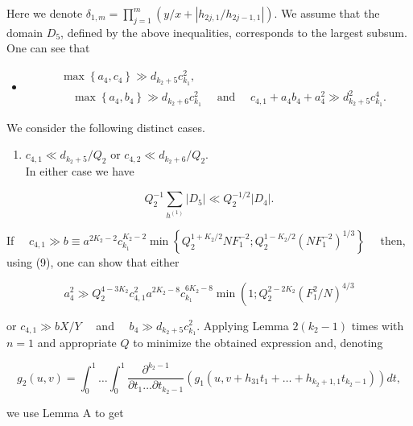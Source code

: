 \documentclass[10pt]{article}
\begin{document}
Here we denote $\delta_{1, m}=\prod_{j=1}^{m}\left(y / x+\left|h_{2 j, 1} / h_{2 j-1,1}\right|\right)$. We assume that the domain $D_{5}$, defined by the above inequalities, corresponds to the largest subsum. One can see that

\begin{itemize}
  \item[(9)] $$
\begin{aligned}
& \max \left\{a_{4}, c_{4}\right\} \gg d_{k_{2}+5} c_{k_{1}}^{2}, \\
& \quad \max \left\{a_{4}, b_{4}\right\} \gg d_{k_{2}+6} c_{k_{1}}^{2} \quad \text { and } \quad c_{4,1}+a_{4} b_{4}+a_{4}^{2} \gg d_{k_{2}+5}^{2} c_{k_{1}}^{4} .
\end{aligned}
$$
\end{itemize}

We consider the following distinct cases.

\begin{enumerate}
  \item $c_{4,1} \ll d_{k_{2}+5} / Q_{2}$ or $c_{4,2} \ll d_{k_{2}+6} / Q_{2}$.\\
In either case we have
\end{enumerate}

$$
Q_{2}^{-1} \sum_{h^{(1)}}\left|D_{5}\right| \ll Q_{2}^{-1 / 2}\left|D_{4}\right| .
$$

If $\quad c_{4,1} \gg b \equiv a^{2 K_{2}-2} c_{k_{1}}^{K_{2}-2} \min \left\{Q_{2}^{1+K_{2} / 2} N F_{1}^{-2} ; Q_{2}^{1-K_{2} / 2}\left(N F_{1}^{-2}\right)^{1 / 3}\right\} \quad$ then, using (9), one can show that either

$$
a_{4}^{2} \gg Q_{2}^{4-3 K_{2}} c_{4,1}^{2} a^{2 K_{2}-8} c_{k_{1}}^{6 K_{2}-8} \min \left(1 ; Q_{2}^{2-2 K_{2}}\left(F_{1}^{2} / N\right)^{4 / 3}\right.
$$

or $c_{4,1} \gg b X / Y \quad$ and $\quad b_{4} \gg d_{k_{2}+5} c_{k_{1}}^{2}$. Applying Lemma $2\left(k_{2}-1\right)$ times with $n=1$ and appropriate $Q$ to minimize the obtained expression and, denoting

$$
g_{2}(u, v)=\int_{0}^{1} \ldots \int_{0}^{1} \frac{\partial^{k_{2}-1}}{\partial t_{1} \ldots \partial t_{k_{2}-1}}\left(g_{1}\left(u, v+h_{31} t_{1}+\ldots+h_{k_{2}+1,1} t_{k_{2}-1}\right)\right) d t,
$$

we use Lemma A to get
\end{document}
